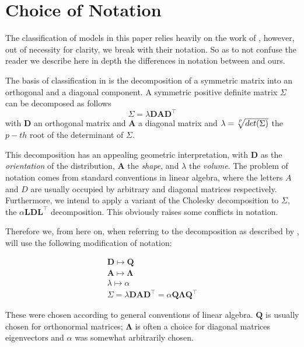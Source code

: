 \section{Choice of Notation}

The classification of models in this paper relies heavily on the work of 
\cite{Cel95}, however, out of necessity for clarity, we break with their 
notation. 
So as to not confuse the reader we describe here in depth the differences in 
notation between \cite{Cel95} and ours.

The basis of classification in \cite{Cel95} is the decomposition of a
symmetric matrix into an orthogonal and a diagonal component.
A symmetric positive definite matrix $ \Sigma $ can be decomposed as follows
    \[ \Sigma = \lambda \pmb{D} \pmb{A} \pmb{D}^{\top} \]
with $ \pmb{D} $ an orthogonal matrix and $ \pmb{A} $ a diagonal matrix and
$ \lambda = \sqrt[\uproot{3}p]{det(\Sigma)} $ the $ p-th $ root of the 
determinant of $ \Sigma $.

This decomposition has an appealing geometric interpretation, with $ \pmb{D} $ 
as the \textit{orientation} of the distribution, $ \pmb{A} $ the \textit{shape},
and $ \lambda $ the \textit{volume}. The problem of notation comes from standard 
conventions in linear algebra, where the letters $A$ and $D$ are usually 
occupied by arbitrary and diagonal matrices respectively. Furthermore, we intend
to apply a variant of the Cholesky decomposition to $ \Sigma $, the 
$ \alpha\pmb{L}\pmb{D}\pmb{L}^{\top} $ decomposition. This obviously raises some
conflicts in notation.

Therefore we, from here on, when referring to the decomposition as described by 
\cite{Cel95}, will use the following modification of notation:

\begin{gather*} 
    \pmb{D} \longmapsto \pmb{Q} \\
    \pmb{A} \longmapsto \pmb{\Lambda} \\
    \lambda \longmapsto \alpha  \\
    \Sigma = \lambda \pmb{D} \pmb{A} \pmb{D}^\top =
        \alpha \pmb{Q} \pmb{\Lambda} \pmb{Q}^\top
\end{gather*}

These were chosen according to general conventions of linear algebra. $ \pmb{Q} $
is usually chosen for orthonormal matrices; $ \pmb{\Lambda} $ is often a choice 
for diagonal matrices eigenvectors and $ \alpha $ was somewhat arbitrarily 
chosen.


